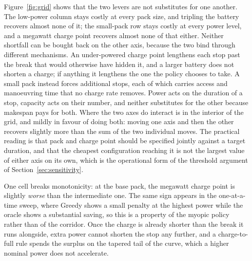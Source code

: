 Figure~\ref{fig:grid} shows that the two levers are not substitutes for one another. The low-power column stays costly at every pack size, and tripling the battery recovers almost none of it; the small-pack row stays costly at every power level, and a megawatt charge point recovers almost none of that either. Neither shortfall can be bought back on the other axis, because the two bind through different mechanisms. An under-powered charge point lengthens each stop past the break that would otherwise have hidden it, and a larger battery does not shorten a charge; if anything it lengthens the one the policy chooses to take. A small pack instead forces additional stops, each of which carries access and manoeuvring time that no charge rate removes. Power acts on the duration of a stop, capacity acts on their number, and neither substitutes for the other because makespan pays for both. Where the two axes do interact is in the interior of the grid, and mildly in favour of doing both: moving one axis and then the other recovers slightly more than the sum of the two individual moves. The practical reading is that pack and charge point should be specified jointly against a target duration, and that the cheapest configuration reaching it is not the largest value of either axis on its own, which is the operational form of the threshold argument of Section~\ref{sec:sensitivity}.

One cell breaks monotonicity: at the base pack, the megawatt charge point is slightly \emph{worse} than the intermediate one. The same sign appears in the one-at-a-time sweep, where Greedy shows a small penalty at the highest power while the oracle shows a substantial saving, so this is a property of the myopic policy rather than of the corridor. Once the charge is already shorter than the break it runs alongside, extra power cannot shorten the stop any further, and a charge-to-full rule spends the surplus on the tapered tail of the curve, which a higher nominal power does not accelerate.



